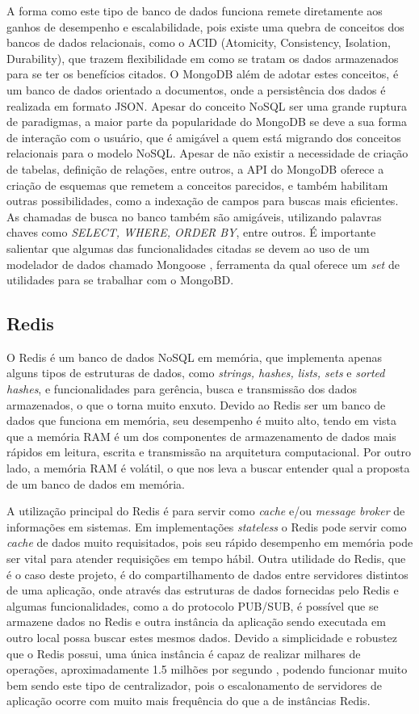 A forma como este tipo de banco de dados funciona remete diretamente aos ganhos de desempenho e escalabilidade, pois existe uma quebra de conceitos dos bancos de dados relacionais, como o ACID (Atomicity, Consistency, Isolation, Durability), que trazem flexibilidade em como se tratam os dados armazenados para se ter os benefícios citados. O MongoDB além de adotar estes conceitos, é um banco de dados orientado a documentos, onde a persistência dos dados é realizada em formato JSON. Apesar do conceito NoSQL ser uma grande ruptura de paradigmas, a maior parte da popularidade do MongoDB se deve a sua forma de interação com o usuário, que é amigável a quem está migrando dos conceitos relacionais para o modelo NoSQL. Apesar de não existir a necessidade de criação de tabelas, definição de relações, entre outros, a API do MongoDB oferece a criação de esquemas que remetem a conceitos parecidos, e também habilitam outras possibilidades, como a indexação de campos para buscas mais eficientes. As chamadas de busca no banco também são amigáveis, utilizando palavras chaves como \textit{SELECT, WHERE, ORDER BY}, entre outros. É importante salientar que algumas das funcionalidades citadas se devem ao uso de um modelador de dados chamado Mongoose \cite{mongoose}, ferramenta da qual oferece um \textit{set} de utilidades para se trabalhar com o MongoBD.
 
\subsection{Redis}
O Redis é um banco de dados NoSQL em memória, que implementa apenas alguns tipos de estruturas de dados, como \textit{strings, hashes, lists, sets} e \textit{sorted hashes}, e funcionalidades para gerência, busca e transmissão dos dados armazenados, o que o torna muito enxuto. Devido ao Redis ser um banco de dados que funciona em memória, seu desempenho é muito alto, tendo em vista que a memória RAM é um dos componentes de armazenamento de dados mais rápidos em leitura, escrita e transmissão na arquitetura computacional. Por outro lado, a memória RAM é volátil, o que nos leva a buscar entender qual a proposta de um banco de dados em memória.

A utilização principal do Redis é para servir como \textit{cache} e/ou \textit{message broker} de informações em sistemas. Em implementações \textit{stateless} o Redis pode servir como \textit{cache} de dados muito requisitados, pois seu rápido desempenho em memória pode ser vital para atender requisições em tempo hábil. Outra utilidade do Redis, que é o caso deste projeto, é do compartilhamento de dados entre servidores distintos de uma aplicação, onde através das estruturas de dados fornecidas pelo Redis e algumas funcionalidades, como a do protocolo PUB/SUB, é possível que se armazene dados no Redis e outra instância da aplicação sendo executada em outro local possa buscar estes mesmos dados. Devido a simplicidade e robustez que o Redis possui, uma única instância é capaz de realizar milhares de operações, aproximadamente 1.5 milhões por segundo \cite{redis-metrics}, podendo funcionar muito bem sendo este tipo de centralizador, pois o escalonamento de servidores de aplicação ocorre com muito mais frequência do que a de instâncias Redis. 

